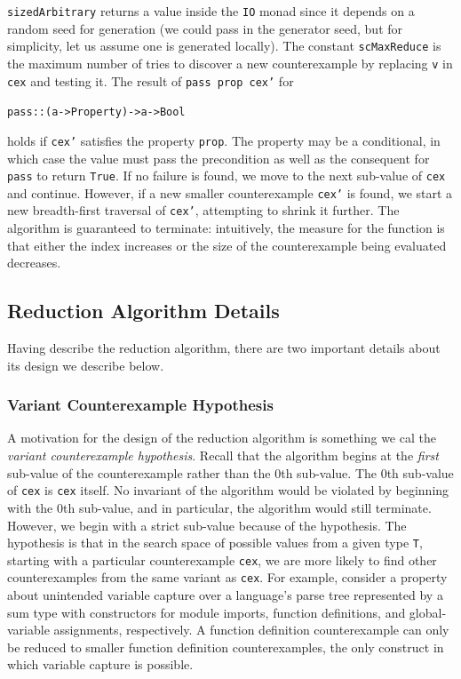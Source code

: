 \documentclass[10pt]{sigplanconf}
\newenvironment{code}{\begin{alltt}}{\end{alltt}}
\newcommand{\ttp}[1]{\texttt{#1}}
\begin{document}
\ttp{sizedArbitrary} returns a value inside the \ttp{IO} monad since it depends
on a random seed for generation (we could pass in the generator seed, but for
simplicity, let us assume one is generated locally).  The constant
\ttp{scMaxReduce} is the maximum number of tries to discover a new
counterexample by replacing \ttp{v} in \ttp{cex} and testing it.  The result of
\ttp{pass prop cex'} for
%
\begin{code}
pass :: (a -> Property) -> a -> Bool
\end{code}
%
\noindent
holds if \ttp{cex'} satisfies the property \ttp{prop}.  The property may be a
conditional, in which case the value must pass the precondition as well as the
consequent for \ttp{pass} to return \ttp{True}.  If no failure is found, we move
to the next sub-value of \ttp{cex} and continue.  However, if a new smaller
counterexample \ttp{cex'} is found, we start a new breadth-first traversal of
\ttp{cex'}, attempting to shrink it further.  The algorithm is guaranteed to
terminate: intuitively, the measure for the function is that either the index
increases or the size of the counterexample being evaluated decreases.

\subsection{Reduction Algorithm Details}
Having describe the reduction algorithm, there are two important details about
its design we describe below.

\subsubsection{Variant Counterexample Hypothesis}
A motivation for the design of the reduction algorithm is something we cal the
\emph{variant counterexample hypothesis}.  Recall that the algorithm begins at
the \emph{first} sub-value of the counterexample rather than the 0th sub-value.
The 0th sub-value of \ttp{cex} is \ttp{cex} itself.  No invariant of the
algorithm would be violated by beginning with the 0th sub-value, and in
particular, the algorithm would still terminate.  However, we begin with a
strict sub-value because of the hypothesis.  The hypothesis is that in the
search space of possible values from a given type \ttp{T}, starting with a
particular counterexample \ttp{cex}, we are more likely to find other
counterexamples from the same variant as \ttp{cex}.  For example, consider a
property about unintended variable capture over a language's parse tree
represented by a sum type with constructors for module imports, function
definitions, and global-variable assignments, respectively.  A function
definition counterexample can only be reduced to smaller function definition
counterexamples, the only construct in which variable capture is possible.
\end{document}
